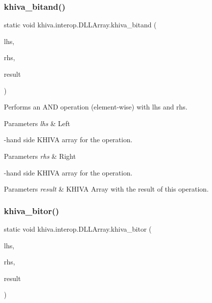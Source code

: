 \subsubsection{\texorpdfstring{khiva\+\_\+bitand()}{khiva\_bitand()}}
{\footnotesize\ttfamily static void khiva.\+interop.\+D\+L\+L\+Array.\+khiva\+\_\+bitand (\begin{DoxyParamCaption}\item[{\mbox{[}\+In\mbox{]} ref Int\+Ptr}]{lhs,  }\item[{\mbox{[}\+In\mbox{]} ref Int\+Ptr}]{rhs,  }\item[{\mbox{[}\+Out\mbox{]} out Int\+Ptr}]{result }\end{DoxyParamCaption})\hspace{0.3cm}{\ttfamily [static]}}



Performs an A\+ND operation (element-\/wise) with lhs and rhs.


\begin{DoxyParams}{Parameters}
{\em lhs} & Left\\
\hline
\end{DoxyParams}
-\/hand side K\+H\+I\+VA array for the operation. 
\begin{DoxyParams}{Parameters}
{\em rhs} & Right\\
\hline
\end{DoxyParams}
-\/hand side K\+H\+I\+VA array for the operation. 
\begin{DoxyParams}{Parameters}
{\em result} & K\+H\+I\+VA Array with the result of this operation.\\
\hline
\end{DoxyParams}
\mbox{\label{classkhiva_1_1interop_1_1_d_l_l_array_a5e1513736d93714a206bf002651700b3}} 
\subsubsection{\texorpdfstring{khiva\+\_\+bitor()}{khiva\_bitor()}}
{\footnotesize\ttfamily static void khiva.\+interop.\+D\+L\+L\+Array.\+khiva\+\_\+bitor (\begin{DoxyParamCaption}\item[{\mbox{[}\+In\mbox{]} ref Int\+Ptr}]{lhs,  }\item[{\mbox{[}\+In\mbox{]} ref Int\+Ptr}]{rhs,  }\item[{\mbox{[}\+Out\mbox{]} out Int\+Ptr}]{result }\end{DoxyParamCaption})\hspace{0.3cm}{\ttfamily [static]}}



